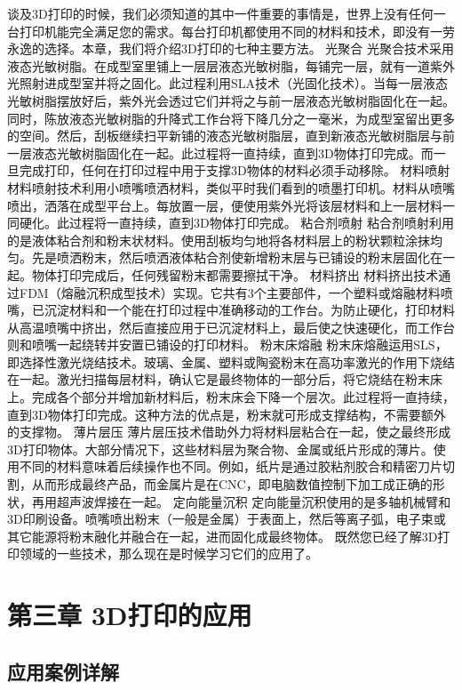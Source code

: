 \documentclass[12pt,UTF8]{ctexbook}
\begin{document}
谈及3D打印的时候，我们必须知道的其中一件重要的事情是，世界上没有任何一台打印机能完全满足您的需求。每台打印机都使用不同的材料和技术，即没有一劳永逸的选择。本章，我们将介绍3D打印的七种主要方法。
光聚合
光聚合技术采用液态光敏树脂。在成型室里铺上一层层液态光敏树脂，每铺完一层，就有一道紫外光照射进成型室并将之固化。此过程利用SLA技术（光固化技术）。当每一层液态光敏树脂摆放好后，紫外光会透过它们并将之与前一层液态光敏树脂固化在一起。同时，陈放液态光敏树脂的升降式工作台将下降几分之一毫米，为成型室留出更多的空间。然后，刮板继续扫平新铺的液态光敏树脂层，直到新液态光敏树脂层与前一层液态光敏树脂固化在一起。此过程将一直持续，直到3D物体打印完成。而一旦完成打印，任何在打印过程中用于支撑3D物体的材料必须手动移除。
材料喷射
材料喷射技术利用小喷嘴喷洒材料，类似平时我们看到的喷墨打印机。材料从喷嘴喷出，洒落在成型平台上。每放置一层，便使用紫外光将该层材料和上一层材料一同硬化。此过程将一直持续，直到3D物体打印完成。
粘合剂喷射
粘合剂喷射利用的是液体粘合剂和粉末状材料。使用刮板均匀地将各材料层上的粉状颗粒涂抹均匀。先是喷洒粉末，然后喷洒液体粘合剂使新增粉末层与已铺设的粉末层固化在一起。物体打印完成后，任何残留粉末都需要擦拭干净。
材料挤出
材料挤出技术通过FDM（熔融沉积成型技术）实现。它共有3个主要部件，一个塑料或熔融材料喷嘴，已沉淀材料和一个能在打印过程中准确移动的工作台。为防止硬化，打印材料从高温喷嘴中挤出，然后直接应用于已沉淀材料上，最后使之快速硬化，而工作台则和喷嘴一起绕转并安置已铺设的打印材料。
粉末床熔融
粉末床熔融运用SLS，即选择性激光烧结技术。玻璃、金属、塑料或陶瓷粉末在高功率激光的作用下烧结在一起。激光扫描每层材料，确认它是最终物体的一部分后，将它烧结在粉末床上。完成各个部分并增加新材料后，粉末床会下降一个层次。此过程将一直持续，直到3D物体打印完成。这种方法的优点是，粉末就可形成支撑结构，不需要额外的支撑物。
薄片层压
薄片层压技术借助外力将材料层粘合在一起，使之最终形成3D打印物体。大部分情况下，这些材料层为聚合物、金属或纸片形成的薄片。使用不同的材料意味着后续操作也不同。例如，纸片是通过胶粘剂胶合和精密刀片切割，从而形成最终产品，而金属片是在CNC，即电脑数值控制下加工成正确的形状，再用超声波焊接在一起。
定向能量沉积
定向能量沉积使用的是多轴机械臂和3D印刷设备。喷嘴喷出粉末（一般是金属）于表面上，然后等离子弧，电子束或其它能源将粉末融化并融合在一起，进而固化成最终物体。
既然您已经了解3D打印领域的一些技术，那么现在是时候学习它们的应用了。

\chapter{第三章 3D打印的应用}

\section{应用案例详解}
\end{document}
